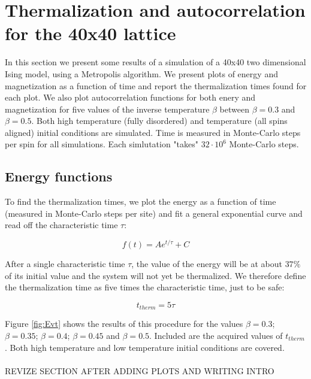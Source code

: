 \documentclass[11pt,a4paper]{article}
\begin{document}
\section{Thermalization and autocorrelation for the 40x40 lattice}


In this section we present some results of a simulation of a 40x40 two dimensional Ising model, using a Metropolis algorithm.
 We present plots of energy and magnetization as a function of time and report the thermalization times found for each plot.
 We also plot autocorrelation functions for both enery and magnetization
 for five values of the inverse temperature $\beta$ between $\beta = 0.3$ and $\beta = 0.5$. 
 Both high temperature (fully disordered) and temperature (all spins aligned) initial conditions are simulated.
 Time is measured in Monte-Carlo steps per spin for all simulations. Each simlutation "takes" $32\cdot 10^6$ 
 Monte-Carlo steps.


\subsection{Energy functions}
To find the thermalization times, we plot the energy as a function of time (measured in Monte-Carlo steps per site)
 and fit a general exponential curve and read off the characteristic time $\tau$:

\begin{equation}\label{eq:exp_decay}
    f(t)=Ae^{t/\tau} + C
\end{equation}

After a single characteristic time $\tau$, the value of the energy will be at about $37\%$ of its initial value and
 the system will not yet be thermalized. We therefore define the
 thermalization time as five times the characteristic time, just to be safe:
 
\begin{equation*}
    t_{therm} = 5\tau
\end{equation*}

Figure \ref{fig:Evt} shows the results of this procedure for the values $\beta = 0.3$; $\beta = 0.35$;
 $\beta = 0.4$; $\beta = 0.45$ and $\beta = 0.5$. Included are the acquired values of $t_{therm}$. Both 
 high temperature and low temperature initial conditions are covered.
\\
\\
{\color{red}REVIZE SECTION AFTER ADDING PLOTS AND WRITING INTRO}
\end{document}
